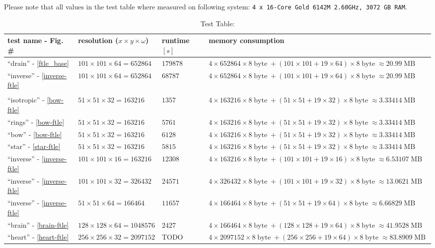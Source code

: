 \documentclass{scrartcl}
\begin{document}
Please note that all values in the test table where measured on following system:
\texttt{4 x 16-Core Gold 6142M 2.60GHz, 3072 GB RAM}.
\begin{table}
\small
\centering
\caption{Test Table:}
\begin{tabularx}{\columnwidth}{X|X|X|X}
\hline\hline
test name - Fig. \# & resolution ($x\times y\times\omega$) & runtime $[s]$ & memory consumption\\
\toprule
\enquote{drain} - \ref{ftle_base} & $101\times101\times64=652864$ & $179878$ & $4\times652864\times 8\mathop{byte} +(101\times101 + 19\times64)\times8\mathop{byte}\approx20.99\mathop{MB}$\\ 
\hline 
\enquote{inverse} - \ref{inverse-ftle} & $101\times101\times64=652864$ & $68787$ & $4\times652864\times 8\mathop{byte} +(101\times101 + 19\times64)\times8\mathop{byte}\approx20.99\mathop{MB}$\\
\hline 
 &  &  & \\ 
\hline 
\enquote{isotropic} - \ref{bow-ftle} & $51\times51\times32=163216$ & $1357$ & $4\times163216\times 8\mathop{byte} +(51\times51 + 19\times32)\times8\mathop{byte}\approx3.33414\mathop{MB}$\\ 
\hline
\enquote{rings} - \ref{bow-ftle} & $51\times51\times32=163216$ & $5761$ & $4\times163216\times 8\mathop{byte} +(51\times51 + 19\times32)\times8\mathop{byte}\approx3.33414\mathop{MB}$\\ 
\hline 
\enquote{bow} - \ref{bow-ftle} & $51\times51\times32=163216$ & $6128$ & $4\times163216\times 8\mathop{byte} +(51\times51 + 19\times32)\times8\mathop{byte}\approx3.33414\mathop{MB}$\\ 
\hline 
\enquote{star} - \ref{star-ftle} & $51\times51\times32=163216$ & $5815$ & $4\times163216\times 8\mathop{byte} +(51\times51 + 19\times32)\times8\mathop{byte}\approx3.33414\mathop{MB}$\\ 
\hline 
\enquote{inverse} - \ref{inverse-ftle} & $101\times101\times16=163216$ & $12308$ & $4\times163216\times 8\mathop{byte} +(101\times101 + 19\times16)\times8\mathop{byte}\approx6.53107\mathop{MB}$\\ 
\hline 
\enquote{inverse} - \ref{inverse-ftle} & $101\times101\times32=326432$ & $24571$ & $4\times326432\times 8\mathop{byte} +(101\times101 + 19\times32)\times8\mathop{byte}\approx13.0621\mathop{MB}$\\ 
\hline 
\enquote{inverse} - \ref{inverse-ftle} & $51\times51\times64=166464$ & $11657$ & $4\times166464\times 8\mathop{byte} +(51\times51 + 19\times64)\times8\mathop{byte}\approx6.66829\mathop{MB}$\\
\hline
\enquote{brain} - \ref{brain-ftle} & $128\times128\times64=1048576$ & $2427$ & $4\times166464\times 8\mathop{byte} +(128\times128 + 19\times64)\times8\mathop{byte}\approx41.9528\mathop{MB}$\\
\hline
\enquote{heart} - \ref{heart-ftle} & $256\times256\times32=2097152$ & TODO & $4\times2097152\times 8\mathop{byte} +(256\times256 + 19\times64)\times8\mathop{byte}\approx83.8909\mathop{MB}$\\
\hline 
\end{tabularx}
   \vskip 1pt
\end{table}
\end{document}
